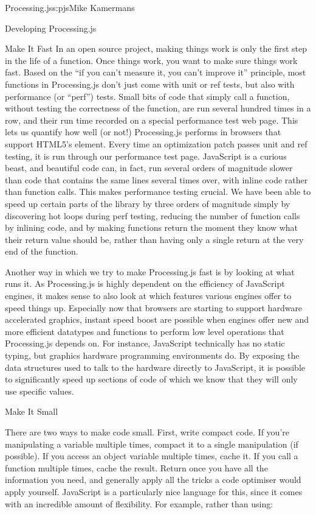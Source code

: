 \begin{aosachapter}{Processing.js}{s:pjs}{Mike Kamermans}
\begin{aosasect1}{Developing Processing.js}
\begin{aosasect2}{Make It Fast}
In an open source project, making things work is only the first step
in the life of a function. Once things work, you want to make sure
things work fast. Based on the ``if you can't measure it, you can't
improve it'' principle, most functions in Processing.js don't just come
with unit or ref tests, but also with performance (or ``perf'')
tests. Small bits of code that simply call a function, without testing
the correctness of the function, are run several hundred times in a
row, and their run time recorded on a special performance test web
page. This lets us quantify how well (or not!) Processing.js performs
in browsers that support HTML5's
 element. Every time an
optimization patch passes unit and ref testing, it is run through our
performance test page. JavaScript is a curious beast, and beautiful
code can, in fact, run several orders of magnitude slower than code
that contains the same lines several times over, with inline code
rather than function calls. This makes performance testing crucial. We
have been able to speed up certain parts of the library by three
orders of magnitude simply by discovering hot loops during perf
testing, reducing the number of function calls by inlining code, and
by making functions return the moment they know what their return
value should be, rather than having only a single return at the very
end of the function.

Another way in which we try to make Processing.js fast is by looking
at what runs it. As Processing.js is highly dependent on the
efficiency of JavaScript engines, it makes sense to also look at which
features various engines offer to speed things up. Especially now that
browsers are starting to support hardware accelerated graphics,
instant speed boost are possible when engines offer new and more
efficient datatypes and functions to perform low level operations that
Processing.js depends on. For instance, JavaScript technically has no
static typing, but graphics hardware programming environments do. By
exposing the data structures used to talk to the hardware directly to
JavaScript, it is possible to significantly speed up sections of code
of which we know that they will only use specific values.

\end{aosasect2}

\begin{aosasect2}{Make It Small}

There are two ways to make code small. First, write compact code. If
you're manipulating a variable multiple times, compact it to a single
manipulation (if possible). If you access an object variable multiple
times, cache it. If you call a function multiple times, cache the
result. Return once you have all the information you need, and
generally apply all the tricks a code optimiser would apply
yourself. JavaScript is a particularly nice language for this, since
it comes with an incredible amount of flexibility. For example, rather
than using:


\end{aosasect2}
\end{aosasect1}
\end{aosachapter}
